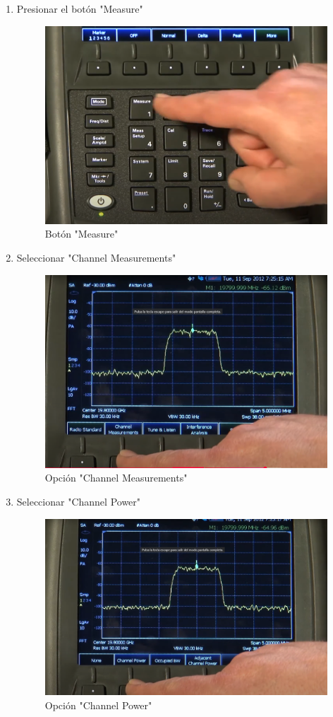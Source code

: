 \documentclass[conference]{IEEEtran}
\begin{document}
	\begin{enumerate}
		\item Presionar el botón "Measure"
		
		\begin{figure}[h]
			\centering
			\includegraphics[width=0.8\linewidth]{media/MB.png}
			\caption{Botón "Measure"}
			\label{fig:MB}
		\end{figure}
		
		\item Seleccionar "Channel Measurements"
		
		\begin{figure}[h]
			\centering
			\includegraphics[width=0.8\linewidth]{media/ChMeasB.png}
			\caption{Opción "Channel Measurements"}
			\label{fig:ChMsB}
		\end{figure}
		
		
		\item Seleccionar "Channel Power"
		
		\begin{figure}[h]
			\centering
			\includegraphics[width=0.8\linewidth]{media/ChPwB.png}
			\caption{Opción "Channel Power"}
			\label{fig:ChPwB}
		\end{figure}
		

\end{enumerate}
\end{document}
